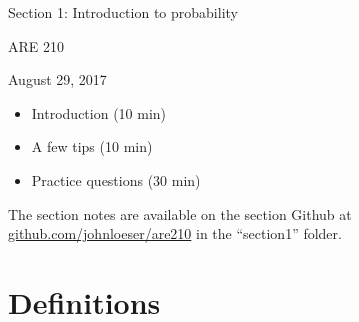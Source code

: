 \documentclass[12pt,english]{article}
\begin{document}
\begin{center}
{\Large{}Section 1: Introduction to probability}
\par\end{center}{\Large \par}

\begin{center}
ARE 210
\par\end{center}

\begin{center}
August 29, 2017
\par\end{center}

\begin{itemize}
	\item Introduction (10 min)
	\item A few tips (10 min)
	\item Practice questions (30 min)
\end{itemize}
The section notes are available on the section Github at \href{github.com/johnloeser/eep152}{github.com/johnloeser/are210} in the ``section1'' folder.

\section{Definitions}
\end{document}
